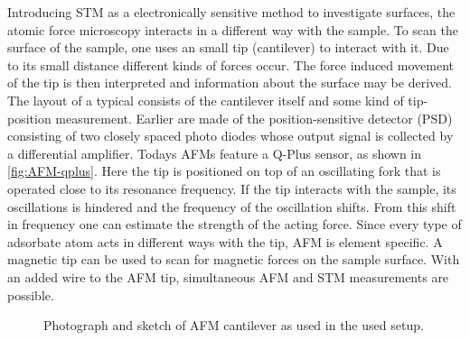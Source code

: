 Introducing STM as a electronically sensitive method to investigate surfaces, the atomic force microscopy interacts in a different way with the sample.
To scan the surface of the sample, one uses an small tip (cantilever) to interact with it. Due to its small distance different kinds of forces occur. The force induced movement of the tip is then interpreted and information about the surface may be derived.
The layout of a typical  consists of the cantilever itself and some kind of tip-position measurement. Earlier are made of the position-sensitive detector (PSD) consisting of two closely spaced photo diodes whose output signal is collected by a differential amplifier. Todays AFMs feature a Q-Plus sensor, as shown in \autoref{fig:AFM-qplus}. Here the tip is positioned on top of an oscillating fork that is operated close to its resonance frequency. If the tip interacts with the sample, its oscillations is hindered and the frequency of the oscillation shifts. From this shift in frequency one can estimate the strength of the acting force. Since every type of adsorbate atom acts in different ways with the tip, AFM is element specific. A magnetic tip can be used to scan for magnetic forces on the sample surface. With an added wire to the AFM tip, simultaneous AFM and STM measurements are possible. 

\begin{figure}\centering
	
	\caption{Photograph  and sketch  of AFM cantilever as used in the used setup. }
	\label{fig:AFM-tuning-fork}
\end{figure}	


